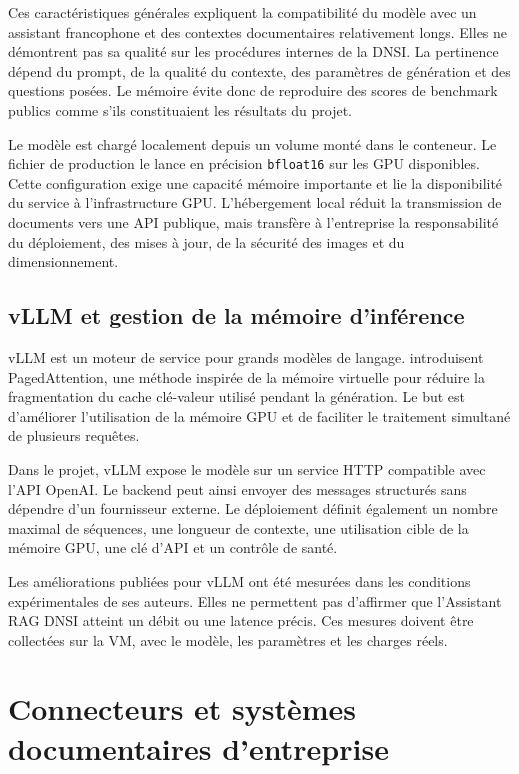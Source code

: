 Ces caractéristiques générales expliquent la compatibilité du modèle avec un assistant francophone et des contextes documentaires relativement longs. Elles ne démontrent pas sa qualité sur les procédures internes de la DNSI. La pertinence dépend du prompt, de la qualité du contexte, des paramètres de génération et des questions posées. Le mémoire évite donc de reproduire des scores de benchmark publics comme s'ils constituaient les résultats du projet.

Le modèle est chargé localement depuis un volume monté dans le conteneur. Le fichier de production le lance en précision \texttt{bfloat16} sur les GPU disponibles. Cette configuration exige une capacité mémoire importante et lie la disponibilité du service à l'infrastructure GPU. L'hébergement local réduit la transmission de documents vers une API publique, mais transfère à l'entreprise la responsabilité du déploiement, des mises à jour, de la sécurité des images et du dimensionnement.

\subsection{vLLM et gestion de la mémoire d'inférence}

vLLM est un moteur de service pour grands modèles de langage. \citet{Kwon2023vLLM} introduisent PagedAttention, une méthode inspirée de la mémoire virtuelle pour réduire la fragmentation du cache clé-valeur utilisé pendant la génération. Le but est d'améliorer l'utilisation de la mémoire GPU et de faciliter le traitement simultané de plusieurs requêtes.

Dans le projet, vLLM expose le modèle sur un service HTTP compatible avec l'API OpenAI. Le backend peut ainsi envoyer des messages structurés sans dépendre d'un fournisseur externe. Le déploiement définit également un nombre maximal de séquences, une longueur de contexte, une utilisation cible de la mémoire GPU, une clé d'API et un contrôle de santé.

Les améliorations publiées pour vLLM ont été mesurées dans les conditions expérimentales de ses auteurs. Elles ne permettent pas d'affirmer que l'Assistant RAG DNSI atteint un débit ou une latence précis. Ces mesures doivent être collectées sur la VM, avec le modèle, les paramètres et les charges réels.

\section{Connecteurs et systèmes documentaires d'entreprise}

